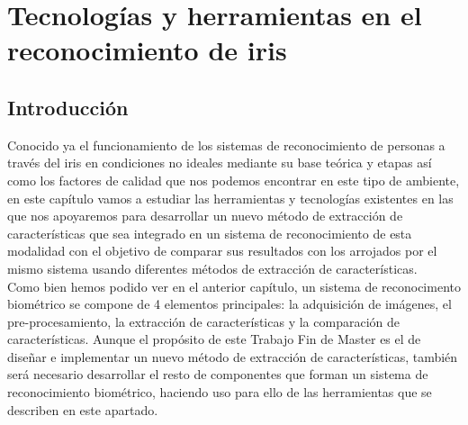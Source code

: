 
\chapter{Tecnologías y herramientas en el reconocimiento de iris} %

\label{Capítulo 3} %




\section{Introducción}

Conocido ya el funcionamiento de los sistemas de reconocimiento de personas a través del iris en condiciones no ideales mediante su base teórica y etapas así como los factores de calidad que nos podemos encontrar en este tipo de ambiente, en este capítulo vamos a estudiar las herramientas y tecnologías existentes en las que nos apoyaremos para desarrollar un nuevo método de extracción de características que sea integrado en un sistema de reconocimiento de esta modalidad con el objetivo de comparar sus resultados con los arrojados por el mismo sistema usando diferentes métodos de extracción de características. \\

Como bien hemos podido ver en el anterior capítulo, un sistema de reconocimento biométrico se compone de 4 elementos principales: la adquisición de imágenes, el pre-procesamiento, la extracción de características y la comparación de características. Aunque el propósito de este Trabajo Fin de Master es el de diseñar e implementar un nuevo método de extracción de características, también será necesario desarrollar el resto de componentes que forman un sistema de reconocimiento biométrico, haciendo uso para ello de las herramientas que se describen en este apartado.\\ 

